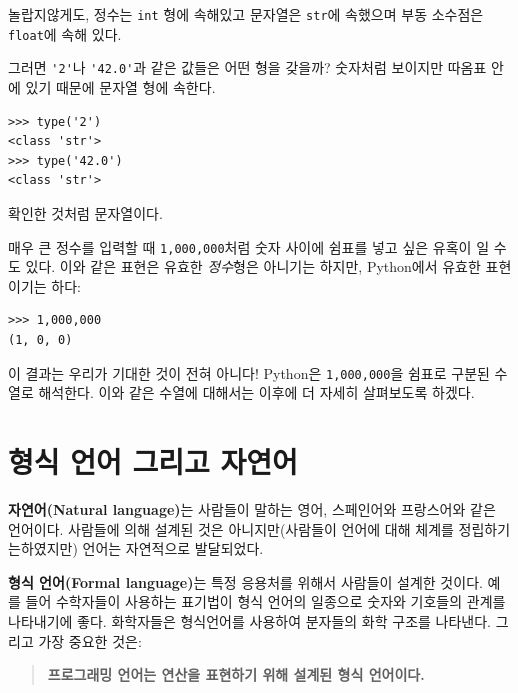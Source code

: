 \documentclass[10pt]{book}
\begin{document}
놀랍지않게도, 정수는 {\tt int} 형에 속해있고 문자열은 {\tt str}에
속했으며 부동 소수점은 {\tt float}에 속해 있다.

그러면 \verb"'2'"나 \verb"'42.0'"과 같은 값들은 어떤 형을 갖을까?
숫자처럼 보이지만 따옴표 안에 있기 때문에 문자열 형에 속한다.

\begin{verbatim}
>>> type('2')
<class 'str'>
>>> type('42.0')
<class 'str'>
\end{verbatim}
%
확인한 것처럼 문자열이다.

매우 큰 정수를 입력할 때 {\tt 1,000,000}처럼 숫자 사이에 쉼표를 넣고 싶은 유혹이 일 수도 있다.  이와 같은 표현은 유효한 {\em 정수}형은 아니기는 하지만, Python에서 유효한 표현이기는 하다:

\begin{verbatim}
>>> 1,000,000
(1, 0, 0)
\end{verbatim}
%
이 결과는 우리가 기대한 것이 전혀 아니다!  Python은 {\tt 1,000,000}을
쉼표로 구분된 수열로 해석한다.  이와 같은 수열에 대해서는
이후에 더 자세히 살펴보도록 하겠다.




\section{형식 언어 그리고 자연어}

{\bf 자연어(Natural language)}는 사람들이 말하는 영어, 스페인어와
프랑스어와 같은 언어이다.  사람들에 의해 설계된 것은 아니지만(사람들이
언어에 대해 체계를 정립하기는하였지만) 언어는 자연적으로 발달되었다.

{\bf 형식 언어(Formal language)}는 특정 응용처를 위해서 사람들이 설계한
것이다.  예를 들어 수학자들이 사용하는 표기법이 형식 언어의 일종으로
숫자와 기호들의 관계를 나타내기에 좋다.  화학자들은 형식언어를 사용하여
분자들의 화학 구조를 나타낸다.  그리고 가장 중요한 것은:

\begin{quote}
{\bf 프로그래밍 언어는 연산을 표현하기 위해 설계된 형식 언어이다. }
\end{quote}
\end{document}
